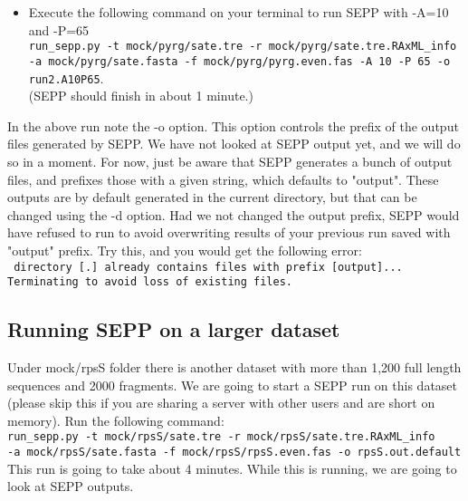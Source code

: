 \documentclass[11pt]{article} %
\newcommand{\sepp}{SEPP\xspace}
\newcommand{\ins}[1]{{\tt #1}}
\newcommand{\file}[1]{{\sf #1}}
\begin{document}
\begin{itemize}
\item Execute the following command on your terminal to run \sepp with -A=10 and -P=65\\

\ins{run\_sepp.py -t mock/pyrg/sate.tre -r mock/pyrg/sate.tre.RAxML\_info -a mock/pyrg/sate.fasta -f mock/pyrg/pyrg.even.fas -A 10 -P 65 -o run2.A10P65}. \\

(\sepp should finish in about 1 minute.)
\end{itemize}

In the above run note the -o option. This option controls the prefix of the output files generated by \sepp. We have not looked at \sepp output yet, and we will do so in a moment. For now, just be aware that \sepp generates a bunch of output files, and prefixes those with a given string, which defaults to "output". These outputs are by default generated in the current directory, but that can be changed using the -d option. Had we not changed the output prefix, \sepp would have refused to run to avoid overwriting results of your previous run saved with "output" prefix. Try this, and you would get the following error:\\
\ins{ directory [.] already contains files with prefix [output]...
Terminating to avoid loss of existing files.
}


\subsection{Running \sepp on a larger dataset}
Under \file{mock/rpsS} folder there is another dataset with more than 1,200 full length sequences and 2000 fragments. We are going to start a \sepp run on this dataset (please skip this if you are sharing a server with other users and are short on memory). Run the following command:\\

\ins{run\_sepp.py -t mock/rpsS/sate.tre -r mock/rpsS/sate.tre.RAxML\_info \\ -a mock/rpsS/sate.fasta -f mock/rpsS/rpsS.even.fas -o rpsS.out.default}\\

This run is going to take about 4 minutes. While this is running, we are going to look at \sepp outputs. 
\end{document}
